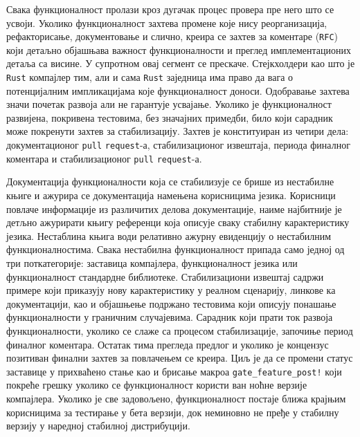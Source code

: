 Свака функционалност пролази кроз дугачак процес провера пре него 
што се усвоји. Уколико функционалност захтева промене које нису реорганизација, рефакторисање, документовање
и слично, креира се захтев за коментаре (\verb|RFC|) који детаљно објашњава важност функционалности и 
преглед имплементационих детаља са висине. У супротном овај сегмент се прескаче. Стејкхолдери као што је \verb|Rust| компајлер тим, али и сама \verb|Rust| заједница 
има право да вага о потенцијалним импликацијама које функционалност доноси. Одобравање захтева значи почетак 
развоја али не гарантује усвајање. Уколико је функционалност развијена, покривена тестовима, 
без значајних примедби, било који сарадник може покренути захтев за стабилизацију. Захтев је конституиран из 
четири дела: документационог \verb|pull| \verb|request|-а, стабилизационог извештаја, 
периода финалног коментара и стабилизационог \verb|pull| \verb|request|-а.

Документација функционалности која се стабилизује се брише из нестабилне књиге \cite{unstable} и ажурира се 
документација намењена корисницима језика. Корисници повлаче информације из различитих делова документације,
наиме најбитније је детљно ажурирати књигу референци \cite{rust-reference} која описује сваку стабилну 
карактеристику језика. Нестаблина књига води релативно ажурну евиденцију о нестабилним функционалностима.
Свака нестабилна функционалност припада само једној од три поткатегорије: заставица компајлера, функционалност језика или
функционалност стандардне библиотеке. Стабилизациони извештај садржи примере који приказују нову карактеристику 
у реалном сценарију, линкове ка документацији, као и објашњење подржано тестовима који описују понашање функционалности у 
граничним случајевима. Сарадник који прати ток развоја функционалности, уколико се слаже са процесом 
стабилизације, започиње период финалног коментара. Остатак тима прегледа предлог и уколико је концензус
позитиван финални захтев за повлачењем се креира. Циљ је да се промени статус заставице у прихваћено
стање као и брисање макроа \verb|gate_feature_post!| који покреће грешку уколико се функционалност користи ван ноћне верзије компајлера.
Уколико је све задовољено, функционалност постаје ближа крајњим корисницима за тестирање у бета верзији, док
неминовно не пређе у стабилну верзију у наредној стабилној дистрибуцији. 

